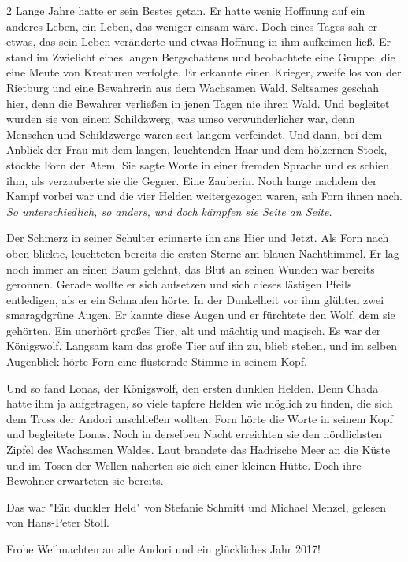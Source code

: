 \documentclass[10pt, a4paper, oneside]{book}
\begin{document}
\begin{multicols}{2}
Lange Jahre hatte er sein Bestes getan. Er hatte wenig Hoffnung auf ein anderes Leben, ein Leben, das weniger einsam wäre. Doch eines Tages sah er etwas, das sein Leben veränderte und etwas Hoffnung in ihm aufkeimen ließ. Er stand im Zwielicht eines langen Bergschattens und beobachtete eine Gruppe, die eine Meute von Kreaturen verfolgte. Er erkannte einen Krieger, zweifellos von der Rietburg und eine Bewahrerin aus dem Wachsamen Wald. Seltsames geschah hier, denn die Bewahrer verließen in jenen Tagen nie ihren Wald. Und begleitet wurden sie von einem Schildzwerg, was umso verwunderlicher war, denn Menschen und Schildzwerge waren seit langem verfeindet. Und dann, bei dem Anblick der Frau mit dem langen, leuchtenden Haar und dem hölzernen Stock, stockte Forn der Atem. Sie sagte Worte in einer fremden Sprache und es schien ihm, als verzauberte sie die Gegner. Eine Zauberin. Noch lange nachdem der Kampf vorbei war und die vier Helden weitergezogen waren, sah Forn ihnen nach. \textit{So unterschiedlich, so anders, und doch kämpfen sie Seite an Seite.}

Der Schmerz in seiner Schulter erinnerte ihn ans Hier und Jetzt. Als Forn nach oben blickte, leuchteten bereits die ersten Sterne am blauen Nachthimmel. Er lag noch immer an einen Baum gelehnt, das Blut an seinen Wunden war bereits geronnen. Gerade wollte er sich aufsetzen und sich dieses lästigen Pfeils entledigen, als er ein Schnaufen hörte. In der Dunkelheit vor ihm glühten zwei smaragdgrüne Augen. Er kannte diese Augen und er fürchtete den Wolf, dem sie gehörten. Ein unerhört großes Tier, alt und mächtig und magisch. Es war der Königswolf. Langsam kam das große Tier auf ihn zu, blieb stehen, und im selben Augenblick hörte Forn eine flüsternde Stimme in seinem Kopf.

Und so fand Lonas, der Königswolf, den ersten dunklen Helden. Denn Chada hatte ihm ja aufgetragen, so viele tapfere Helden wie möglich zu finden, die sich dem Tross der Andori anschließen wollten. Forn hörte die Worte in seinem Kopf und begleitete Lonas. Noch in derselben Nacht erreichten sie den nördlichsten Zipfel des Wachsamen Waldes. Laut brandete das Hadrische Meer an die Küste und im Tosen der Wellen näherten sie sich einer kleinen Hütte. Doch ihre Bewohner erwarteten sie bereits.\bigskip

Das war "Ein dunkler Held" von Stefanie Schmitt und Michael Menzel, gelesen von Hans-Peter Stoll.

Frohe Weihnachten an alle Andori und ein glückliches Jahr 2017!


\end{multicols}
\end{document}
